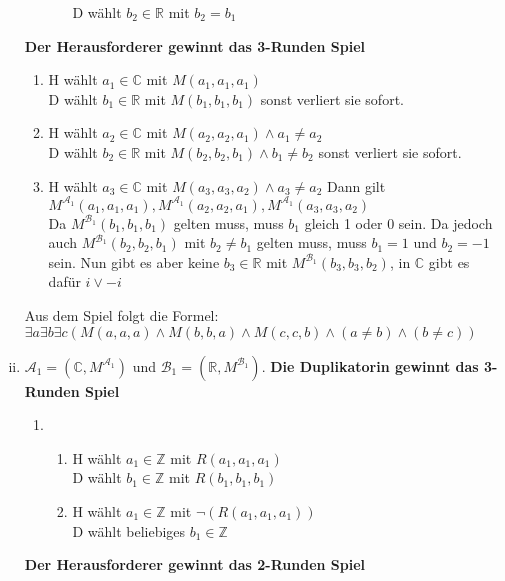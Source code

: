 \documentclass[a4paper,10pt]{article}
\newcommand{\Z}{\mathbb{Z}}
\begin{document}
\begin{enumerate}[(i)]
\begin{enumerate}
\begin{enumerate}
					D wählt $b_2 \in \mathbb{R}$ mit  $b_2 = b_1$
			\end{enumerate}
		\end{enumerate}
	\textbf{Der Herausforderer gewinnt das 3-Runden Spiel}
		\begin{enumerate}[1. \text{Zug:}]
			\item  	H wählt $a_1 \in \mathbb{C}$ mit $M(a_1,a_1,a_1)$ \\
				D wählt $b_1 \in \mathbb{R}$ mit $M(b_1,b_1,b_1)$ sonst verliert sie sofort.
			\item 	H wählt $a_2 \in \mathbb{C}$ mit $M(a_2,a_2,a_1) \land a_1 \neq a_2$ \\
				D wählt $b_2 \in \mathbb{R}$ mit $M(b_2,b_2,b_1) \land b_1 \neq b_2$ sonst verliert sie sofort.
			\item  	H wählt $a_3 \in \mathbb{C}$ mit $M(a_3,a_3,a_2) \land a_3 \neq a_2$
			Dann gilt $M^{\mathcal{A}_1}(a_1,a_1,a_1), M^{\mathcal{A}_1}(a_2,a_2,a_1), M^{\mathcal{A}_1}(a_3,a_3,a_2)$ \\
			Da $M^{\mathcal{B}_1}(b_1,b_1,b_1)$ gelten muss, muss $b_1$ gleich 1 oder 0 sein. Da jedoch auch $M^{\mathcal{B}_1}(b_2,b_2,b_1)$ mit $b_2 \neq b_1$ gelten muss, muss $b_1 = 1$ und $b_2 = -1$ sein. Nun gibt es aber keine $b_3 \in \mathbb{R}$ mit $M^{\mathcal{B}_1}(b_3,b_3,b_2)$, in $\mathbb{C}$ gibt es dafür $i \lor -i$
		\end{enumerate}
	Aus dem Spiel folgt die Formel: $\exists a \exists b \exists c (M(a,a,a) \land M(b,b,a) \land M(c,c,b) \land (a \neq b) \land (b \neq c))$ 
	\item  	$\mathcal{A}_1 = (\mathbb{C},M^{\mathcal{A}_1})$ und $\mathcal{B}_1 = (\mathbb{R}, M^{\mathcal{B}_1})$.
	\textbf{Die Duplikatorin gewinnt das 3-Runden Spiel}
		\begin{enumerate}[1. \text{Zug:}]
			\item  	
			\begin{enumerate}
				\item  	H wählt $a_1 \in \Z$ mit $R(a_1,a_1,a_1)$ \\
					D wählt $b_1 \in \Z$ mit $R(b_1,b_1,b_1) $ 
				\item  	H wählt $a_1 \in \mathbb{Z}$ mit $\lnot(R(a_1,a_1,a_1))$ \\
					D wählt beliebiges $b_1 \in \mathbb{Z}$
			\end{enumerate}
		\end{enumerate}
	\textbf{Der Herausforderer gewinnt das 2-Runden Spiel}
		\begin{enumerate}[1. \text{Zug:}]

\end{enumerate}
\end{enumerate}
\end{document}
